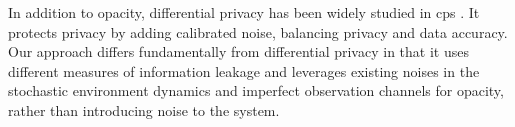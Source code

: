 In addition to  opacity,  differential privacy has been widely studied in \ac{cps} \cite{hassan2019differential}. It protects privacy by adding calibrated noise, balancing privacy and data accuracy. %
Our approach differs fundamentally from differential privacy in that it uses different measures of information leakage and leverages existing   noises in the stochastic environment dynamics and imperfect observation channels for opacity, rather than introducing noise to the system. 




